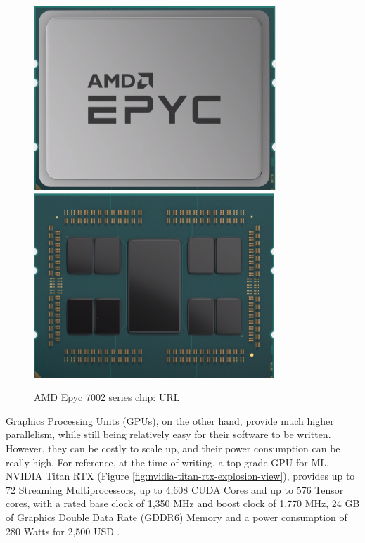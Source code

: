 \begin{figure} [H]
	\centering
	\includegraphics[scale=0.45]{Images/Hardware/amd-epyc.png}
	\includegraphics[scale=0.45]{Images/Hardware/amd-epyc-dies.png}
	\decoRule
	\caption[AMD Epyc 7002 series chip]{AMD Epyc 7002 series chip: \href{https://www.amd.com/en/processors/epyc-7002-series}{URL}}
	\label{fig:amd-epyc-7002-chip}
\end{figure}

Graphics Processing Units (GPUs), on the other hand, provide much higher parallelism, while still being relatively easy for their software to be written. However, they can be costly to scale up, and their power consumption can be really high. For reference, at the time of writing, a top-grade GPU for ML, NVIDIA Titan RTX (Figure \ref{fig:nvidia-titan-rtx-explosion-view}), provides up to 72 Streaming Multiprocessors, up to 4,608 CUDA Cores and up to 576 Tensor cores, with a rated base clock of 1,350 MHz and boost clock of 1,770 MHz, 24 GB of Graphics Double Data Rate (GDDR6) Memory and a power consumption of 280 Watts for 2,500 USD \cite{NVIDIA-Titan-RTX-GPU}.

